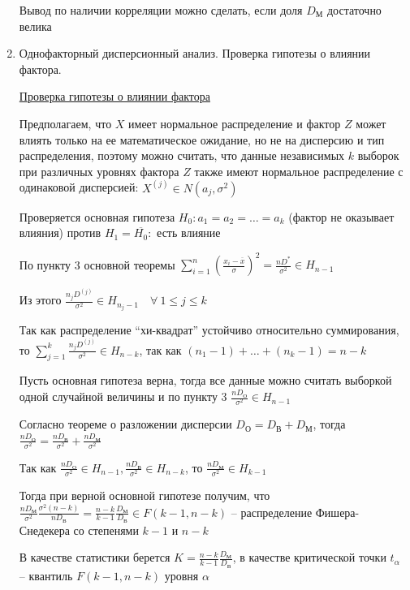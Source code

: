 \begin{enumerate}
    Вывод по наличии корреляции можно сделать, если доля $D_\text{М}$ достаточно велика

    \item Однофакторный дисперсионный анализ. Проверка гипотезы о влиянии фактора.

    \hyperlink{factor_influence_hypothesis}{Проверка гипотезы о влиянии фактора}
    
    Предполагаем, что $X$ имеет нормальное распределение и фактор $Z$ может влиять только на ее математическое ожидание, 
    но не на дисперсию и тип распределения, поэтому можно считать, что данные независимых $k$ выборок при различных уровнях фактора $Z$
    также имеют нормальное распределение с одинаковой дисперсией: $X^{(j)} \in N(a_j, \sigma^2)$

    Проверяется основная гипотеза $H_0 : a_1 = a_2 = \dots = a_k$ (фактор не оказывает влияния) против $H_1 = \overline{H_0} : $ есть влияние

    По пункту 3 основной теоремы $\sum_{i = 1}^n \left(\frac{x_i - \overline{x}}{\sigma}\right)^2 = \frac{n D^*}{\sigma^2} \in H_{n - 1}$

    Из этого $\frac{n_j D^{(j)}}{\sigma^2} \in H_{n_j - 1} \quad \forall \ 1 \leq j \leq k$

    Так как распределение \enquote{хи-квадрат} устойчиво относительно суммирования, то $\sum_{j = 1}^k \frac{n_j D^{(j)}}{\sigma^2} \in H_{n - k}$, так как
    $(n_1 - 1) + \dots + (n_k - 1) = n - k$

    Пусть основная гипотеза верна, тогда все данные можно считать выборкой одной случайной величины и по пункту 3 $\frac{n D_{\text{О}}}{\sigma^2} \in H_{n - 1}$

    Согласно теореме о разложении дисперсии $D_\text{О} = D_\text{В} + D_\text{М}$, тогда $\frac{n D_{\text{О}}}{\sigma^2} = \frac{n D_{\text{В}}}{\sigma^2} + \frac{n D_{\text{М}}}{\sigma^2}$

    Так как $\frac{n D_{\text{О}}}{\sigma^2} \in H_{n - 1}, \frac{n D_{\text{В}}}{\sigma^2} \in H_{n - k}$, то $\frac{n D_{\text{М}}}{\sigma^2} \in H_{k - 1}$

    Тогда при верной основной гипотезе получим, что $\frac{n D_{\text{М}}}{\sigma^2} \frac{\sigma^2 (n - k)}{n D_\text{В}} = \frac{n - k}{k - 1} \frac{D_\text{М}}{D_\text{В}} \in F(k - 1, n - k)$ --
    распределение Фишера-Снедекера со степенями $k - 1$ и $n - k$

    В качестве статистики берется $K = \frac{n - k}{k - 1} \frac{D_\text{М}}{D_\text{В}}$, в качестве критической точки $t_\alpha$ -- квантиль $F(k - 1, n - k)$ уровня $\alpha$


\end{enumerate}
